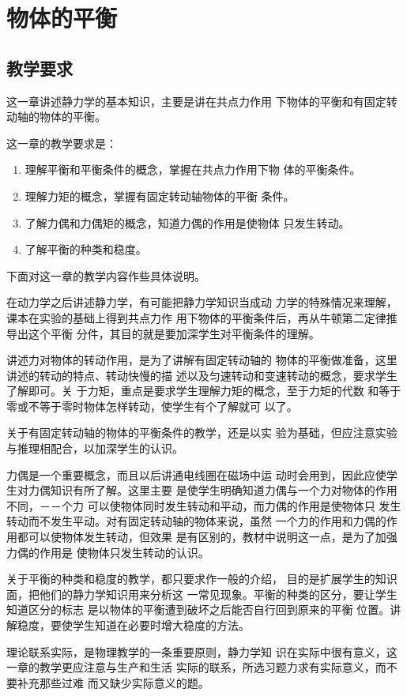 
\chapter{物体的平衡}
\section{教学要求}
这一章讲述静力学的基本知识，主要是讲在共点力作用
下物体的平衡和有固定转动轴的物体的平衡。

这一章的教学要求是：
\begin{enumerate}
\item 理解平衡和平衡条件的概念，掌握在共点力作用下物
体的平衡条件。
\item 理解力矩的概念，掌握有固定转动轴物体的平衡
条件。
\item 了解力偶和力偶矩的概念，知道力偶的作用是使物体
只发生转动。
\item 了解平衡的种类和稳度。
\end{enumerate}

下面对这一章的教学内容作些具体说明。

在动力学之后讲述静力学，有可能把静力学知识当成动
力学的特殊情况来理解，课本在实验的基础上得到共点力作
用下物体的平衡条件后，再从牛顿第二定律推导出这个平衡
分件，其目的就是要加深学生对平衡条件的理解。

讲述力对物体的转动作用，是为了讲解有固定转动轴的
物体的平衡做准备，这里讲述的转动的特点、转动快慢的描
述以及匀速转动和变速转动的概念，要求学生了解即可。关
于力矩，重点是要求学生理解力矩的概念，至于力矩的代数
和等于零或不等于零时物体怎样转动，使学生有个了解就可
以了。

关于有固定转动轴的物体的平衡条件的教学，还是以实
验为基础，但应注意实验与推理相配合，以加深学生的认识。

力偶是一个重要概念，而且以后讲通电线圈在磁场中运
动时会用到，因此应使学生对力偶知识有所了解。这里主要
是使学生明确知道力偶与一个力对物体的作用不同，－－个力
可以使物体同时发生转动和平动，而力偶的作用是使物体只
发生转动而不发生平动。对有固定转动轴的物体来说，虽然
一个力的作用和力偶的作用都可以使物体发生转动，但效果
是有区别的，教材中说明这一点，是为了加强力偶的作用是
使物体只发生转动的认识。

关于平衡的种类和稳度的教学，都只要求作一般的介绍，
目的是扩展学生的知识面，把他们的静力学知识用来分析这
一常见现象。平衡的种类的区分，要让学生知道区分的标志
是以物体的平衡遭到破坏之后能否自行回到原来的平衡
位置。讲解稳度，要使学生知道在必要时增大稳度的方法。

理论联系实际，是物理教学的一条重要原则，静力学知
识在实际中很有意义，这一章的教学更应注意与生产和生活
实际的联系，所选习题力求有实际意义，而不要补充那些过难
而又缺少实际意义的题。

